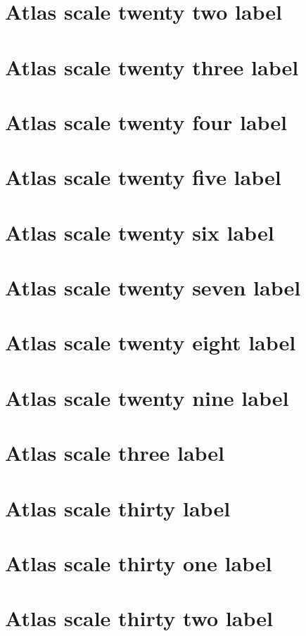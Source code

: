 \documentclass[11pt]{article}
\theoremstyle{definition}
\begin{document}
\section{Atlas scale twenty two label}
\label{ll:labels:atlas-s22}
\section{Atlas scale twenty three label}
\label{ll:labels:atlas-s23}
\section{Atlas scale twenty four label}
\label{ll:labels:atlas-s24}
\section{Atlas scale twenty five label}
\label{ll:labels:atlas-s25}
\section{Atlas scale twenty six label}
\label{ll:labels:atlas-s26}
\section{Atlas scale twenty seven label}
\label{ll:labels:atlas-s27}
\section{Atlas scale twenty eight label}
\label{ll:labels:atlas-s28}
\section{Atlas scale twenty nine label}
\label{ll:labels:atlas-s29}
\section{Atlas scale three label}
\label{ll:labels:atlas-s3}
\section{Atlas scale thirty label}
\label{ll:labels:atlas-s30}
\section{Atlas scale thirty one label}
\label{ll:labels:atlas-s31}
\section{Atlas scale thirty two label}
\label{ll:labels:atlas-s32}
\end{document}
